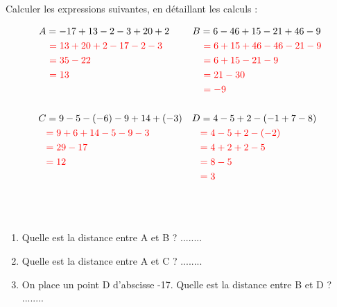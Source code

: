 \documentclass[Controlev2-correction]{subfiles}
\begin{document}
\begin{exercice}[(8 points)] Calculer les expressions suivantes, en détaillant les calculs :

	\begin{align*}
		A & = -17 + 13 - 2 - 3 + 20 + 2               & B & = 6 - 46 + 15 - 21 + 46 - 9                \\
		  & \ \correction{= 13 + 20 + 2 - 17 - 2 - 3} &   & \ \correction{= 6 + 15 + 46 - 46 - 21 - 9} \\
		  & \ \correction{= 35 - 22}                  &   & \ \correction{= 6 + 15 - 21 - 9}           \\
		  & \ \correction{= 13}                       &   & \ \correction{= 21 - 30}                   \\
		  &                                           &   & \ \correction{= -9}                        \\
		\\
		C & = 9 - 5 - (-6) - 9 + 14 + (-3)            & D & = 4 - 5 + 2 - (-1 + 7 - 8)                 \\
		  & \correction{= 9 + 6 + 14 - 5 - 9 - 3}     &   & \correction{= 4 - 5 + 2 - (-2)}            \\
		  & \correction{= 29 - 17}                    &   & \correction{= 4 + 2 + 2 - 5}               \\
		  & \correction{= 12}                         &   & \correction{= 8 - 5}                       \\
		  &                                           &   & \correction{= 3}                           \\
		\\
	\end{align*}
\end{exercice}

\begin{exercice}[(3 points)]\

	\begin{center}
	\end{center}

	\begin{enumerate}
		\item Quelle est la distance entre A et B ? ........
		\item Quelle est la distance entre A et C ? ........
		\item On place un point D d'abscisse -17. Quelle est la distance entre B et D ? ........
	\end{enumerate}
\end{exercice}
\end{document}
